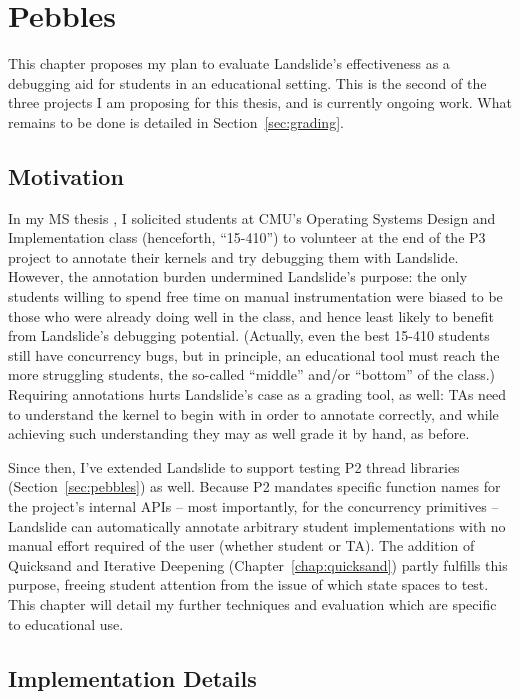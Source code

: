 \chapter{Pebbles}
\label{chap:410}

This chapter proposes my plan to evaluate Landslide's effectiveness as a debugging aid for students in an educational setting.
This is the second of the three projects I am proposing for this thesis, and is currently ongoing work.
What remains to be done is detailed in Section~\ref{sec:grading}.

\section{Motivation}

In my MS thesis \cite{landslide}, I solicited students at CMU's Operating Systems Design and Implementation class
(henceforth, ``15-410'')
to volunteer at the end of the P3 project to annotate their kernels and try debugging them with Landslide.
However, the annotation burden undermined Landslide's purpose:
the only students willing to spend free time on manual instrumentation were biased to be those who were already doing well in the class,
and hence least likely to benefit from Landslide's debugging potential.
(Actually, even the best 15-410 students still have concurrency bugs,
but in principle, an educational tool must reach the more struggling students,
the so-called ``middle'' and/or ``bottom'' of the class.)
%
Requiring annotations hurts Landslide's case as a grading tool, as well:
TAs need to understand the kernel to begin with in order to annotate correctly,
and while achieving such understanding they may as well grade it by hand, as before.

Since then, I've extended Landslide to support testing P2 thread libraries (Section~\ref{sec:pebbles}) as well.
Because P2 mandates specific function names for the project's internal APIs
-- most importantly, for the concurrency primitives --
Landslide can automatically annotate arbitrary student implementations with no manual effort required of the user (whether student or TA).
The addition of Quicksand and Iterative Deepening (Chapter~\ref{chap:quicksand}) partly fulfills this purpose,
freeing student attention from the issue of which state spaces to test.
This chapter will detail my further techniques and evaluation which are specific to educational use.

\section{Implementation Details}

